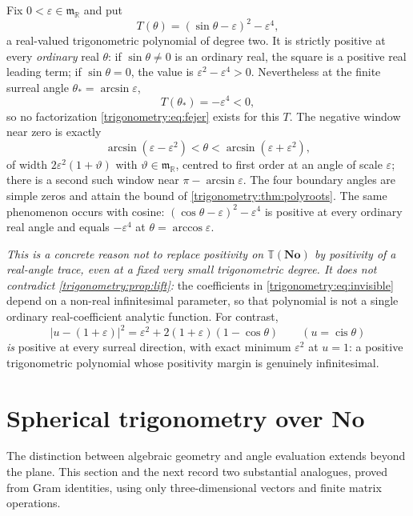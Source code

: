 \documentclass[11pt,letterpaper]{article}
\numberwithin{equation}{section}
\theoremstyle{definition}
\theoremstyle{remark}
\newcommand{\No}{\mathbf{No}}
\newcommand{\R}{\mathbb R}
\newcommand{\mm}{\mathfrak m}
\newcommand{\TT}{\mathbb T}
\newcommand{\eps}{\varepsilon}
\newcommand{\cis}{\operatorname{cis}}
\begin{document}
\begin{example}
\label{trigonometry:ex:invisible}
Fix $0<\eps\in\mm_{\R}$ and put
\begin{equation}\label{trigonometry:eq:invisible}
 T(\theta)=(\sin\theta-\eps)^2-\eps^4,
\end{equation}
a real-valued trigonometric polynomial of degree two. It is strictly positive at every
\emph{ordinary} real $\theta$: if $\sin\theta\ne0$ is an ordinary real, the square is a positive
real leading term; if $\sin\theta=0$, the value is $\eps^2-\eps^4>0$. Nevertheless at the finite
surreal angle $\theta_*=\arcsin\eps$,
\[
 T(\theta_*)=-\eps^4<0,
\]
so no factorization \cref{trigonometry:eq:fejer} exists for this $T$. The negative window near zero
is exactly
\[
 \arcsin(\eps-\eps^2)<\theta<\arcsin(\eps+\eps^2),
\]
of width $2\eps^2(1+\vartheta)$ with $\vartheta\in\mm_{\R}$, centred to first order at an angle of
scale $\eps$; there is a second such window near $\pi-\arcsin\eps$. The four boundary angles are
simple zeros and attain the bound of \cref{trigonometry:thm:polyroots}. The same phenomenon occurs
with cosine: $(\cos\theta-\eps)^2-\eps^4$ is positive at every ordinary real angle and equals
$-\eps^4$ at $\theta=\arccos\eps$.

\emph{This is a concrete reason not to replace positivity on $\TT(\No)$ by positivity of a
real-angle trace, even at a fixed very small trigonometric degree. It does not contradict
\cref{trigonometry:prop:lift}:} the coefficients in \cref{trigonometry:eq:invisible} depend on a
non-real infinitesimal parameter, so that polynomial is not a single ordinary real-coefficient
analytic function. For contrast,
\[
 |u-(1+\eps)|^2=\eps^2+2(1+\eps)(1-\cos\theta)\qquad(u=\cis\theta)
\]
\emph{is} positive at every surreal direction, with exact minimum $\eps^2$ at $u=1$: a positive
trigonometric polynomial whose positivity margin is genuinely infinitesimal.
\end{example}

\section{Spherical trigonometry over \texorpdfstring{$\No$}{No}}\label{trigonometry:sec:spherical}

The distinction between algebraic geometry and angle evaluation extends beyond the plane. This
section and the next record two substantial analogues, proved from Gram identities, using only
three-dimensional vectors and finite matrix operations.
\end{document}
